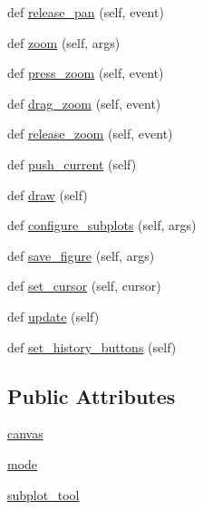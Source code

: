 \begin{DoxyCompactItemize}
\item 
def \hyperlink{classmatplotlib_1_1backend__bases_1_1NavigationToolbar2_a7d2258d9c498f61f3eddacbb1733cd0f}{release\+\_\+pan} (self, event)
\item 
def \hyperlink{classmatplotlib_1_1backend__bases_1_1NavigationToolbar2_aa7ef8b2b960a8471337b3b535da398cd}{zoom} (self, args)
\item 
def \hyperlink{classmatplotlib_1_1backend__bases_1_1NavigationToolbar2_afe0841bc5a45138af9796839d5230bd9}{press\+\_\+zoom} (self, event)
\item 
def \hyperlink{classmatplotlib_1_1backend__bases_1_1NavigationToolbar2_ac2b0055045080d3b628ddb1c5d8b0af3}{drag\+\_\+zoom} (self, event)
\item 
def \hyperlink{classmatplotlib_1_1backend__bases_1_1NavigationToolbar2_a6c55800a60ed62dd4005230b03061b41}{release\+\_\+zoom} (self, event)
\item 
def \hyperlink{classmatplotlib_1_1backend__bases_1_1NavigationToolbar2_ae394385abeedd7ee5464face230ee52b}{push\+\_\+current} (self)
\item 
def \hyperlink{classmatplotlib_1_1backend__bases_1_1NavigationToolbar2_aeb7c09f1ac1bed8cdb04de7c6dc8b671}{draw} (self)
\item 
def \hyperlink{classmatplotlib_1_1backend__bases_1_1NavigationToolbar2_a5ab115e73df3e445b4a6488244aef076}{configure\+\_\+subplots} (self, args)
\item 
def \hyperlink{classmatplotlib_1_1backend__bases_1_1NavigationToolbar2_a874761db5ae05a12d9146bd949281486}{save\+\_\+figure} (self, args)
\item 
def \hyperlink{classmatplotlib_1_1backend__bases_1_1NavigationToolbar2_adaf0678ff5cd9c4c4aadad93e86f1848}{set\+\_\+cursor} (self, cursor)
\item 
def \hyperlink{classmatplotlib_1_1backend__bases_1_1NavigationToolbar2_af5d9d8a27dbf779cb4ef84935087ca9d}{update} (self)
\item 
def \hyperlink{classmatplotlib_1_1backend__bases_1_1NavigationToolbar2_a06703734600e2612f71b6250108df04e}{set\+\_\+history\+\_\+buttons} (self)
\end{DoxyCompactItemize}
\subsection*{Public Attributes}
\begin{DoxyCompactItemize}
\item 
\hyperlink{classmatplotlib_1_1backend__bases_1_1NavigationToolbar2_a1a87a34e3a87d05f78fffea401c5a362}{canvas}
\item 
\hyperlink{classmatplotlib_1_1backend__bases_1_1NavigationToolbar2_a6bf38bfe5efa8669f93a3866b13af66a}{mode}
\item 
\hyperlink{classmatplotlib_1_1backend__bases_1_1NavigationToolbar2_a11f4413a92dce9b119afa239b612ad0f}{subplot\+\_\+tool}
\end{DoxyCompactItemize}
